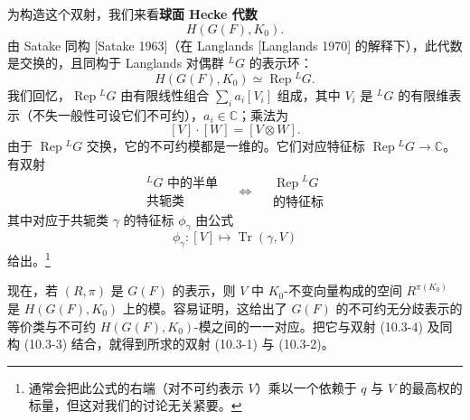 为构造这个双射，我们来看\textbf{球面 Hecke 代数}
\[
    H(G(F),K_0).
\]
由 Satake 同构 [Satake 1963]（在 Langlands [Langlands 1970] 的解释下），此代数是交换的，且同构于 Langlands 对偶群 ${}^LG$ 的表示环：
\begin{equation}
    H(G(F),K_0)\simeq\operatorname{Rep}{}^LG.
    \tag{10.3-3}
\end{equation}
我们回忆，$\operatorname{Rep}{}^LG$ 由有限线性组合 $\sum_i a_i[V_i]$ 组成，其中 $V_i$ 是 ${}^LG$ 的有限维表示（不失一般性可设它们不可约），$a_i\in\mathbb{C}$；乘法为
\[
    [V]\cdot[W]=[V\otimes W].
\]
由于 $\operatorname{Rep}{}^LG$ 交换，它的不可约模都是一维的。它们对应特征标 $\operatorname{Rep}{}^LG\to\mathbb{C}$。有双射
\begin{equation}
    \boxed{\begin{array}{c}\text{${}^LG$ 中的半单}\\[-2pt]\text{共轭类}\end{array}}
    \quad\Longleftrightarrow\quad
    \boxed{\begin{array}{c}\operatorname{Rep}{}^LG\\[-2pt]\text{的特征标}\end{array}}
    \tag{10.3-4}
\end{equation}
其中对应于共轭类 $\gamma$ 的特征标 $\phi_\gamma$ 由公式
\[
    \phi_\gamma:[V]\mapsto\operatorname{Tr}(\gamma,V)
\]
给出。\footnote{通常会把此公式的右端（对不可约表示 $V$）乘以一个依赖于 $q$ 与 $V$ 的最高权的标量，但这对我们的讨论无关紧要。}

现在，若 $(R,\pi)$ 是 $G(F)$ 的表示，则 $V$ 中 $K_0$-不变向量构成的空间 $R^{\pi(K_0)}$ 是 $H(G(F),K_0)$ 上的模。容易证明，这给出了 $G(F)$ 的不可约无分歧表示的等价类与不可约 $H(G(F),K_0)$-模之间的一一对应。把它与双射 (10.3-4) 及同构 (10.3-3) 结合，就得到所求的双射 (10.3-1) 与 (10.3-2)。


